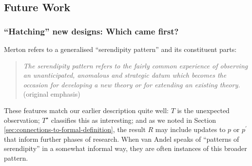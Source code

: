\subsection{Future Work} \label{sec:futurework}

\subsubsection{``Hatching'' new designs: Which came first?}

Merton \cite{merton1948bearing} \cite<cited in>[pp. 195--196]{merton} refers to a generalised ``serendipity pattern''
and its constituent parts:

\begin{quote}
\emph{The serendipity pattern refers to the fairly common experience of observing an \emph{unanticipated}, \emph{anomalous} \emph{and strategic} datum which becomes the occasion for developing a new theory or for extending an existing theory.}~\cite[p. 506]{merton1948bearing} (original emphasis)
\end{quote}

These features match our earlier description quite well: $T$ is the
unexpected observation; $T^\star$ classifies this as interesting; and
as we noted in Section \ref{sec:connections-to-formal-definition}, the
result $R$ may include updates to $p$ or $p^{\prime}$ that inform
further phases of research.
%
When van Andel \citeyear{van1994anatomy} speaks of ``patterns of
serendipity'' in a somewhat informal way, they are often instances of
this broader pattern.

